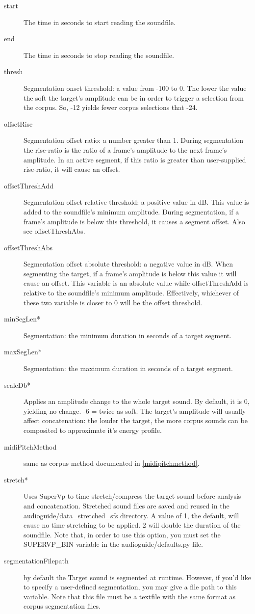 \documentclass{article}
\begin{document}
\begin{spacing}{1.2}
\begin{description}
\item[start] The time in seconds to start reading the soundfile.
\item[end] The time in seconds to stop reading the soundfile.  
\item[thresh] Segmentation onset threshold: a value from -100 to 0.  The lower the value the soft the target's amplitude can be in order to trigger a selection from the corpus.  So, -12 yields fewer corpus selections that -24.  
\item[offsetRise] Segmentation offset ratio: a number greater than 1.   During segmentation the rise-ratio is the ratio of a frame's amplitude to the next frame's amplitude.   In an active segment, if this ratio is greater than user-supplied rise-ratio, it will cause an offset.
\item[offsetThreshAdd] Segmentation offset relative threshold: a positive value in dB.  
This value is added to the soundfile's minimum amplitude.  During segmentation, if a frame's amplitude is below this threshold, it causes a segment offset.  Also see offsetThreshAbs.
\item[offsetThreshAbs] Segmentation offset absolute threshold: a negative value in dB.  When segmenting the target, if a frame's amplitude is below this value it will cause an offset.  This variable is an absolute value while offsetThreshAdd is relative to the soundfile's minimum amplitude.  Effectively, whichever of these two variable is closer to 0 will be the offset threshold.
\item[minSegLen*] Segmentation: the minimum duration in seconds of a target segment.
\item[maxSegLen*] Segmentation: the maximum duration in seconds of a target segment.

\item[scaleDb*] Applies an amplitude change to the whole target sound. By default, it is 0, yielding no change. -6 = twice as soft.  The target's amplitude will usually affect concatenation: the louder the target, the more corpus sounds can be composited to approximate it's energy profile.

\item[midiPitchMethod] same as corpus method documented in \ref{midipitchmethod}.
\item[stretch*] Uses SuperVp to time stretch/compress the target sound before analysis and concatenation.  Stretched sound files are saved and reused in the audioguide/data\_stretched\_sfs directory.  A value of 1, the default, will cause no time stretching to be applied.  2 will double the duration of the soundfile.  Note that, in order to use this option, you must set the SUPERVP\_BIN variable in the audioguide/defaults.py file.
\item[segmentationFilepath] by default the Target sound is segmented at runtime.  However, if you'd like to specify a user-defined segmentation, you may give a file path to this variable.  Note that this file must be a textfile with the same format as corpus segmentation files.
\end{description}



\end{spacing}
\end{document}
